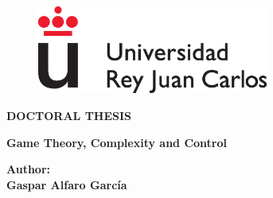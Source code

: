 \documentclass[a4paper,12pt]{newsiambook}
\begin{document}




\begin{center}

\begin{figure}
\centering
\includegraphics[clip,width=7.6cm,trim=0cm 0cm 0cm 0cm]{Images/logoURJC.eps}                        %
\end{figure}


\vspace*{1.5cm}

\begin{center}                                                    %
{\Huge {\bf DOCTORAL THESIS}}
\end{center}

%
%




\vspace*{1.4cm}

\begin{center}                                                     %
	{\LARGE {\bf Game Theory, Complexity and Control}}
\end{center}

\vspace*{1.2cm}







\begin{center}
 { \bf Author: \\
 	\vspace*{0.25cm}
 \large Gaspar Alfaro García}
\end{center}


\end{center}
\end{document}
